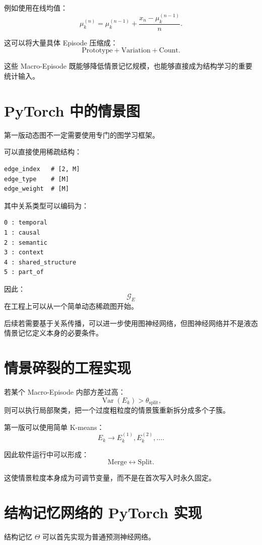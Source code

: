 例如使用在线均值：
\[
\mu_k^{(n)}
=
\mu_k^{(n-1)}
+
\frac{
x_n-\mu_k^{(n-1)}
}{
n
}.
\]

这可以将大量具体 Episode 压缩成：
\[
\boxed{
\mathrm{Prototype}
+
\mathrm{Variation}
+
\mathrm{Count}.
}
\]

这些 Macro-Episode 既能够降低情景记忆规模，也能够直接成为结构学习的重要统计输入。

\section{PyTorch 中的情景图}

第一版动态图不一定需要使用专门的图学习框架。

可以直接使用稀疏结构：

\begin{verbatim}
edge_index   # [2, M]
edge_type    # [M]
edge_weight  # [M]
\end{verbatim}

其中关系类型可以编码为：

\begin{verbatim}
0 : temporal
1 : causal
2 : semantic
3 : context
4 : shared_structure
5 : part_of
\end{verbatim}

因此：
\[
\mathcal{G}_E
\]
在工程上可以从一个简单动态稀疏图开始。

后续若需要基于关系传播，可以进一步使用图神经网络，但图神经网络并不是液态情景记忆定义本身的必要条件。

\section{情景碎裂的工程实现}

若某个 Macro-Episode 内部方差过高：
\[
\operatorname{Var}(E_k)
>
\theta_{\mathrm{split}},
\]
则可以执行局部聚类，把一个过度粗粒度的情景簇重新拆分成多个子簇。

第一版可以使用简单 K-means：
\[
E_k
\rightarrow
E_k^{(1)},
E_k^{(2)},
\ldots.
\]

因此软件运行中可以形成：
\[
\boxed{
\mathrm{Merge}
\leftrightarrow
\mathrm{Split}.
}
\]

这使情景粒度本身成为可调节变量，而不是在首次写入时永久固定。

\section{结构记忆网络的 PyTorch 实现}

结构记忆 $\Theta$ 可以首先实现为普通预测神经网络。

